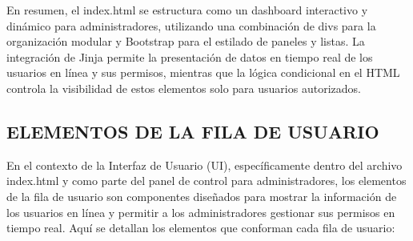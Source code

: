 \documentclass{report}
\begin{document}
En resumen, el index.html se estructura como un dashboard interactivo y dinámico para administradores, utilizando una combinación de 
divs para la organización modular y Bootstrap para el estilado de paneles y listas. La integración de Jinja permite la presentación de datos 
en tiempo real de los usuarios en línea y sus permisos, mientras que la lógica condicional en el HTML controla la visibilidad de estos elementos 
solo para usuarios autorizados.

\subsection{ELEMENTOS DE LA FILA DE USUARIO}
En el contexto de la Interfaz de Usuario (UI), específicamente dentro del archivo index.html y como parte del panel de control 
para administradores, los elementos de la fila de usuario son componentes diseñados para mostrar la información de los usuarios en 
línea y permitir a los administradores gestionar sus permisos en tiempo real.
Aquí se detallan los elementos que conforman cada fila de usuario:
\end{document}
